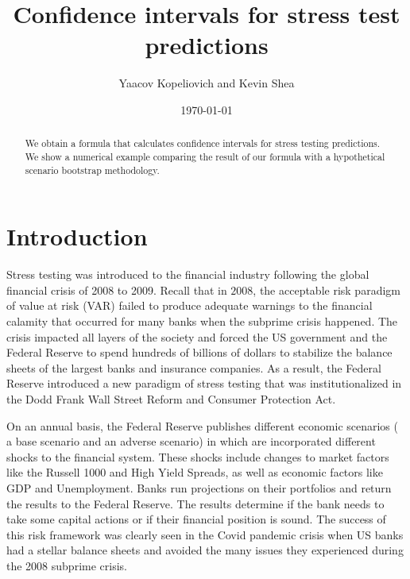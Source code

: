 \documentclass[a4paper]{amsart}
\begin{document}
\title{Confidence intervals for stress test predictions}

\author{Yaacov Kopeliovich and Kevin Shea}
\address{Department of Finance, School of Business, University of Connecticut, Storrs}
\address{Disciplined Alpha, One Marina Drive Ste. 1490, Boston MA 02210} 
\date{\today}
\newtheorem{thm}{Theorem}
\newtheorem{cor}{Corollary}
\newtheorem{lem}{Lemma}
\newtheorem{con}{Conjecture}
\newtheorem{prop}{Proposition}
\theoremstyle{definition}
\newtheorem{defn}{Definition}
\newtheorem{assum}{Assumption}
\newtheorem*{Probl}{Problem} 
\newtheorem{rmk}{Remark}


\newcommand{\res}{\operatorname{res}}
\renewcommand{\mod}{\operatorname{mod}}
\newcommand{\Integer}{\operatorname{\mathbb{Z}}}
\newcommand{\lcm}{\operatorname{lcm}}
\newcommand{\rme}{\textrm{e}}
\newcommand{\m}{\phantom{-}}

\allowdisplaybreaks[4]
\begin{abstract}
We obtain a formula that calculates confidence intervals for stress testing predictions.  We show a numerical example comparing the result of our formula with a hypothetical scenario bootstrap methodology. 
\end{abstract}
\maketitle
\section{Introduction} 
Stress testing was introduced to the financial industry following the global financial crisis of 2008 to 2009. Recall that in $2008$, the acceptable risk paradigm of value at risk (VAR) failed to produce adequate warnings to the financial calamity that occurred for many banks when the subprime crisis happened. The crisis impacted all layers of the society and forced the US government and the Federal Reserve to spend hundreds of billions of dollars to stabilize the balance sheets of the largest banks and insurance companies. 
As a result, the Federal Reserve introduced a new paradigm of stress testing that was institutionalized in the Dodd Frank Wall Street Reform and Consumer Protection Act.

  On an annual basis, the Federal Reserve publishes different economic scenarios ( a base scenario and an adverse scenario) in which are incorporated different shocks to the financial system. These shocks include changes to market factors like the Russell 1000 and High Yield Spreads, as well as economic factors like GDP and Unemployment.  Banks run projections on their portfolios and return the results to the Federal Reserve. The results determine if the bank needs to take some capital actions or if their financial position is sound.
The success of this risk framework was clearly seen in the Covid pandemic crisis when US banks had a stellar balance sheets and avoided the many issues they experienced during the 2008 subprime crisis. 
\end{document}
